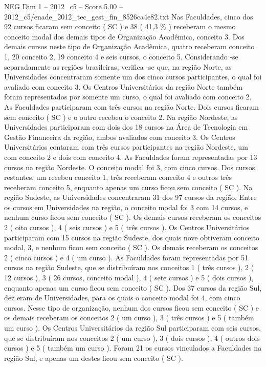 \begin{textsample}{NEG Dim 1 – 2012\_c5 – Score 5.00 – 2012\_c5/enade\_2012\_tec\_gest\_fin\_8526ca4e82.txt}
Nas Faculdades, cinco dos 92 cursos ficaram sem conceito ( SC ) e 38 ( 41,3 \% ) receberam o mesmo conceito modal dos demais tipos de Organização Acadêmica, conceito 3.
Dos demais cursos neste tipo de Organização Acadêmica, quatro receberam conceito 1, 20 conceito 2, 19 conceito 4 e seis cursos, o conceito 5.
Considerando -se separadamente as regiões brasileiras, verifica -se que, na região Norte, as Universidades concentraram somente um dos cinco cursos participantes, o qual foi avaliado com conceito 3.
Os Centros Universitários da região Norte também foram representados por somente um curso, o qual foi avaliado com conceito 2.
As Faculdades participaram com três cursos na região Norte.
Dois cursos ficaram sem conceito ( SC ) e o outro recebeu o conceito 2.
Na região Nordeste, as Universidades participaram com dois dos 18 cursos na Área de Tecnologia em Gestão Financeira da região, ambos avaliados com conceito 3.
Os Centros Universitários contaram com três cursos participantes na região Nordeste, um com conceito 2 e dois com conceito 4.
As Faculdades foram representadas por 13 cursos na região Nordeste.
O conceito modal foi 3, com cinco cursos.
Dos cursos restantes, um recebeu conceito 1, três receberam conceito 4 e outros três receberam conceito 5, enquanto apenas um curso ficou sem conceito ( SC ).
Na região Sudeste, as Universidades concentraram 31 dos 97 cursos da região.
Entre os cursos em Universidades na região, o conceito modal foi 3 com 14 cursos, e nenhum curso ficou sem conceito ( SC ).
Os demais cursos receberam os conceitos 2 ( oito cursos ), 4 ( seis cursos ) e 5 ( três cursos ).
Os Centros Universitários participaram com 15 cursos na região Sudeste, dos quais nove obtiveram conceito modal, 3, e nenhum ficou sem conceito ( SC ).
Os demais receberam os conceitos 2 ( cinco cursos ) e 4 ( um curso ).
As Faculdades foram representadas por 51 cursos na região Sudeste, que se distribuíram nos conceitos 1 ( três cursos ), 2 ( 12 cursos ), 3 ( 26 cursos, conceito modal ), 4 ( sete cursos ) e 5 ( dois cursos ), enquanto apenas um curso ficou sem conceito ( SC ).
Dos 37 cursos da região Sul, dez eram de Universidades, para os quais o conceito modal foi 4, com cinco cursos.
Nesse tipo de organização, nenhum dos cursos ficou sem conceito ( SC ) e os demais receberam os conceitos 2 ( um curso ), 3 ( três cursos ) e 5 ( também um curso ).
Os Centros Universitários da região Sul participaram com seis cursos, que se distribuíram nos conceitos 2 ( um curso ), 3 ( dois cursos ), 4 ( outros dois cursos ) e 5 ( também um curso ).
Foram 21 os cursos vinculados a Faculdades na região Sul, e apenas um destes ficou sem conceito ( SC ).

\end{textsample}
